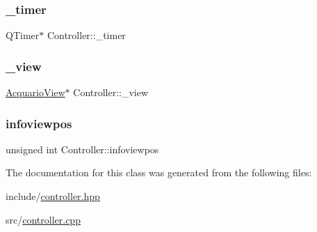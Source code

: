 \subsubsection{\texorpdfstring{\+\_\+timer}{\_timer}}
{\footnotesize\ttfamily Q\+Timer$\ast$ Controller\+::\+\_\+timer\hspace{0.3cm}{\ttfamily [private]}}

\mbox{\label{classController_a0b21753f4ca1740b9ff415a4e4606df3_a0b21753f4ca1740b9ff415a4e4606df3}} 
\subsubsection{\texorpdfstring{\+\_\+view}{\_view}}
{\footnotesize\ttfamily \hyperlink{classAcquarioView}{Acquario\+View}$\ast$ Controller\+::\+\_\+view\hspace{0.3cm}{\ttfamily [private]}}

\mbox{\label{classController_a956a159c2089d8ecda76278b7f57e859_a956a159c2089d8ecda76278b7f57e859}} 
\subsubsection{\texorpdfstring{infoviewpos}{infoviewpos}}
{\footnotesize\ttfamily unsigned int Controller\+::infoviewpos\hspace{0.3cm}{\ttfamily [private]}}



The documentation for this class was generated from the following files\+:\begin{DoxyCompactItemize}
\item 
include/\hyperlink{controller_8hpp}{controller.\+hpp}\item 
src/\hyperlink{controller_8cpp}{controller.\+cpp}\end{DoxyCompactItemize}

